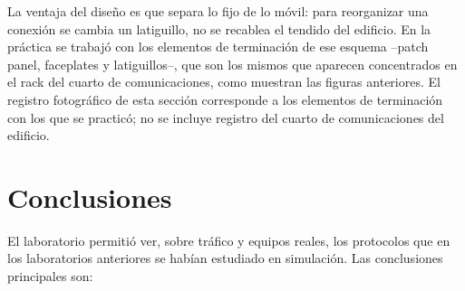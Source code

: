 \documentclass[11pt,a4paper]{report}
\begin{document}
La ventaja del diseño es que separa lo fijo de lo móvil: para reorganizar una conexión
se cambia un latiguillo, no se recablea el tendido del edificio. En la práctica se
trabajó con los elementos de terminación de ese esquema --patch panel, faceplates y
latiguillos--, que son los mismos que aparecen concentrados en el rack del cuarto de
comunicaciones, como muestran las figuras anteriores. El registro fotográfico de esta
sección corresponde a los elementos de terminación con los que se practicó; no se
incluye registro del cuarto de comunicaciones del edificio.

\section{Conclusiones}

El laboratorio permitió ver, sobre tráfico y equipos reales, los protocolos que en
los laboratorios anteriores se habían estudiado en simulación. Las conclusiones
principales son:
\end{document}
